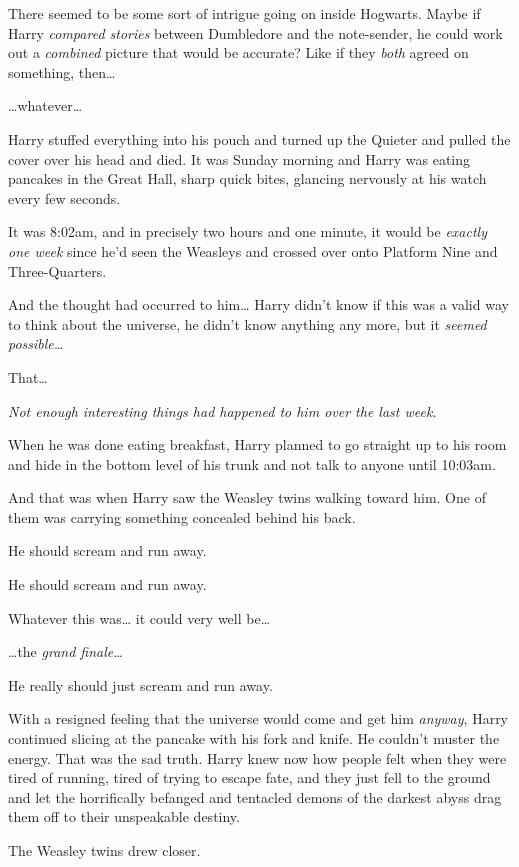 There seemed to be some sort of intrigue going on inside Hogwarts. Maybe if
Harry \emph{compared stories} between Dumbledore and the note-sender, he could
work out a \emph{combined} picture that would be accurate? Like if they
\emph{both} agreed on something, then{\ldots}

{\ldots}whatever{\ldots}

Harry stuffed everything into his pouch and turned up the Quieter and pulled
the cover over his head and died.
\later
It was Sunday morning and Harry was eating pancakes in the Great Hall, sharp
quick bites, glancing nervously at his watch every few seconds.

It was 8:02am, and in precisely two hours and one minute, it would be
\emph{exactly one week} since he'd seen the Weasleys and crossed over onto
Platform Nine and Three-Quarters.

And the thought had occurred to him{\ldots} Harry didn't know if this was a
valid way to think about the universe, he didn't know anything any more, but it
\emph{seemed possible{\ldots}}

That{\ldots}

\emph{Not enough interesting things had happened to him over the last week.}

When he was done eating breakfast, Harry planned to go straight up to his room
and hide in the bottom level of his trunk and not talk to anyone until 10:03am.

And that was when Harry saw the Weasley twins walking toward him. One of them
was carrying something concealed behind his back.

He should scream and run away.

He should scream and run away.

Whatever this was{\ldots} it could very well be{\ldots}

{\ldots}the \emph{grand finale{\ldots}}

He really should just scream and run away.

With a resigned feeling that the universe would come and get him \emph{anyway},
Harry continued slicing at the pancake with his fork and knife. He couldn't
muster the energy. That was the sad truth. Harry knew now how people felt when
they were tired of running, tired of trying to escape fate, and they just fell
to the ground and let the horrifically befanged and tentacled demons of the
darkest abyss drag them off to their unspeakable destiny.

The Weasley twins drew closer.

